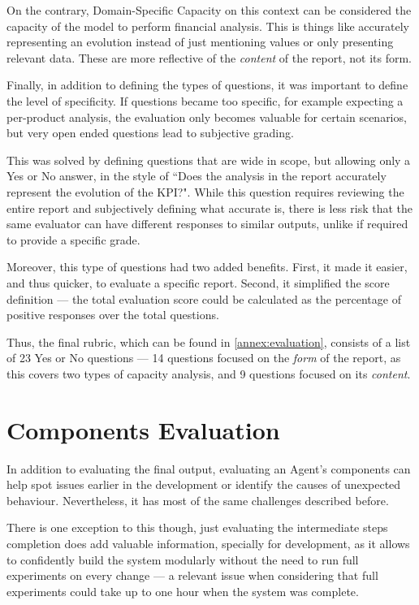 \documentclass[a4paper]{report}
\begin{document}
On the contrary, Domain-Specific Capacity on this context can be considered the capacity of the model to perform financial analysis. This is things like accurately representing an evolution instead of just mentioning values or only presenting relevant data. These are more reflective of the \textit{content} of the report, not its form.

Finally, in addition to defining the types of questions, it was important to define the level of specificity. If questions became too specific, for example expecting a per-product analysis, the evaluation only becomes valuable for certain scenarios, but very open ended questions lead to subjective grading.

This was solved by defining questions that are wide in scope, but allowing only a Yes or No answer, in the style of ``Does the analysis in the report accurately represent the evolution of the KPI?". While this question requires reviewing the entire report and subjectively defining what accurate is, there is less risk that the same evaluator can have different responses to similar outputs, unlike if required to provide a specific grade.

Moreover, this type of questions had two added benefits. First, it made it easier, and thus quicker, to evaluate a specific report. Second, it simplified the score definition --- the total evaluation score could be calculated as the percentage of positive responses over the total questions.

Thus, the final rubric, which can be found in \autoref{annex:evaluation}, consists of a list of 23 Yes or No questions --- 14 questions focused on the \textit{form} of the report, as this covers two types of capacity analysis, and 9 questions focused on its \textit{content}.

\section{Components Evaluation}
\label{sec:components-evals}

In addition to evaluating the final output, evaluating an Agent's components can help spot issues earlier in the development or identify the causes of unexpected behaviour. Nevertheless, it has most of the same challenges described before.

There is one exception to this though, just evaluating the intermediate steps completion does add valuable information, specially for development, as it allows to confidently build the system modularly without the need to run full experiments on every change --- a relevant issue when considering that full experiments could take up to one hour when the system was complete.
\end{document}
